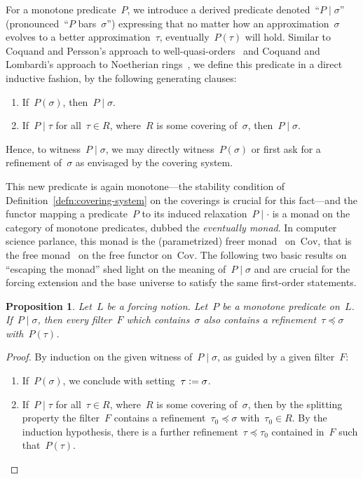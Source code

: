 \documentclass[com,11pt,crcready]{iosart2x}
\theoremstyle{definition}
\theoremstyle{plain}
\newtheorem{proposition}[definition]{Proposition}
\theoremstyle{remark}
\newcommand{\defeq}{\vcentcolon=}
\newcommand{\Cov}{\mathrm{Cov}}
\renewcommand{\_}{\mathpunct{.}\,}
\begin{document}
For a monotone predicate~$P$, we introduce a derived predicate denoted~``$P
\mid \sigma$'' (pronounced~``$P$ bars~$\sigma$'') expressing that no matter how an approximation~$\sigma$ evolves
to a better approximation~$\tau$, eventually~$P(\tau)$ will hold. Similar to
Coquand and Persson's approach to well-quasi-orders~\cite[Definition~6]{coquand-persson:groebner} and
Coquand and Lombardi's approach to Noetherian
rings~\cite{coquand-lombardi:krull,coquand:invariant}, we define this predicate
in a direct inductive fashion, by the following generating clauses:
\begin{enumerate}
\item If~$P(\sigma)$, then~$P \mid \sigma$.
\item If~$P \mid \tau$ for all~$\tau \in R$, where~$R$ is some covering
of~$\sigma$, then~$P \mid \sigma$.
\end{enumerate}
Hence, to witness~$P \mid \sigma$, we may directly witness~$P(\sigma)$ or first
ask for a refinement of~$\sigma$ as envisaged by the covering system.

This new predicate is again monotone---the stability condition of
Definition~\ref{defn:covering-system} on the coverings is
crucial for this fact---and the functor mapping a predicate~$P$ to its induced
relaxation~$P\mid\cdot$ is a monad on the category of monotone predicates, dubbed the
\emph{eventually monad}. In computer science parlance, this monad is
the (parametrized) freer monad~\cite{kiselyov-ishii:freer,apfelmus:operational}
on~$\Cov$, that is the free monad~\cite[Section~6]{swierstra:carte}
on the free functor on~$\Cov$.
%
The following two basic results on ``escaping the monad'' shed light on the
meaning of~$P \mid \sigma$ and are crucial for the forcing extension and the
base universe to satisfy the same first-order statements.

\begin{proposition}\label{prop:ev-points}Let~$L$ be a forcing notion. Let~$P$
be a monotone predicate on~$L$. If~$P \mid \sigma$, then every filter~$F$ which
contains~$\sigma$ also contains a refinement~$\tau \preceq \sigma$
with~$P(\tau)$.
\end{proposition}

\begin{proof}By induction on the given witness of~$P \mid \sigma$, as guided by
a given filter~$F$:
\begin{enumerate}
\item If~$P(\sigma)$, we conclude with setting~$\tau \defeq \sigma$.
\item If~$P \mid \tau$ for all~$\tau \in R$, where~$R$ is some covering
of~$\sigma$, then by the splitting property the filter~$F$ contains a refinement~$\tau_0
\preceq \sigma$ with~$\tau_0 \in R$. By the induction hypothesis, there is a
further refinement~$\tau \preceq \tau_0$ contained in~$F$ such that~$P(\tau)$.\qedhere
\end{enumerate}
\end{proof}
\end{document}
